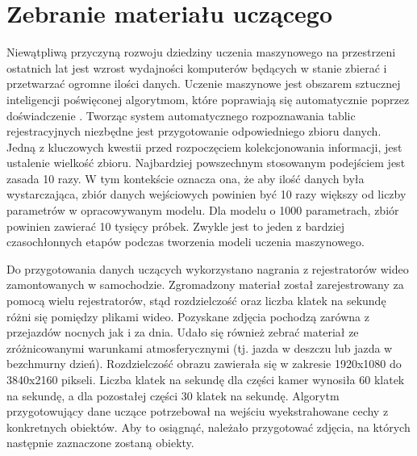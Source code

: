 %



\chapter{Zebranie materiału uczącego}\label{ch:preparing_data_set}

Niewątpliwą przyczyną rozwoju dziedziny uczenia maszynowego na przestrzeni ostatnich lat jest wzrost wydajności komputerów będących w stanie zbierać i przetwarzać ogromne ilości danych.
Uczenie maszynowe jest obszarem sztucznej inteligencji poświęconej algorytmom, które poprawiają się automatycznie poprzez doświadczenie \cite{Mitchell97}.
Tworząc system automatycznego rozpoznawania tablic rejestracyjnych niezbędne jest przygotowanie odpowiedniego zbioru danych.
Jedną z kluczowych kwestii przed rozpoczęciem kolekcjonowania informacji, jest ustalenie wielkość zbioru.
Najbardziej powszechnym stosowanym podejściem jest zasada 10 razy.
W tym kontekście oznacza ona, że aby ilość danych była wystarczająca, zbiór danych wejściowych powinien być 10 razy większy od liczby parametrów w opracowywanym modelu.
Dla modelu o 1000 parametrach, zbiór powinien zawierać 10 tysięcy próbek.
Zwykle jest to jeden z bardziej czasochłonnych etapów podczas tworzenia modeli uczenia maszynowego.

Do przygotowania danych uczących wykorzystano nagrania z rejestratorów wideo zamontowanych w samochodzie.
Zgromadzony materiał został zarejestrowany za pomocą wielu rejestratorów, stąd rozdzielczość oraz liczba klatek na sekundę różni się pomiędzy plikami wideo.
Pozyskane zdjęcia pochodzą zarówna z przejazdów nocnych jak i za dnia.
Udało się również zebrać materiał ze zróżnicowanymi warunkami atmosferycznymi (tj. jazda w deszczu lub jazda w bezchmurny dzień).
Rozdzielczość obrazu zawierała się w zakresie 1920x1080 do 3840x2160 pikseli.
Liczba klatek na sekundę dla części kamer wynosiła 60 klatek na sekundę, a dla pozostałej części 30 klatek na sekundę.
Algorytm przygotowujący dane uczące potrzebował na wejściu wyekstrahowane cechy z konkretnych obiektów.
Aby to osiągnąć, należało przygotować zdjęcia, na których następnie zaznaczone zostaną obiekty.

